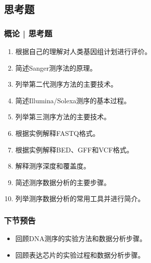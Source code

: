 \subsection{思考题}
\begin{frame}
  \frametitle{概论 | 思考题}
  \begin{enumerate}
    \item 根据自己的理解对人类基因组计划进行评价。
    \item 简述Sanger测序法的原理。
    \item 列举第二代测序方法的主要技术。
    \item 简述Illumina/Solexa测序的基本过程。
    \item 列举第三测序方法的主要技术。
    \item 根据实例解释FASTQ格式。
    \item 根据实例解释BED、GFF和VCF格式。
    \item 解释测序深度和覆盖度。
    \item 简述测序数据分析的主要步骤。
    \item 列举测序数据分析的常用工具并进行简介。
  \end{enumerate}
\end{frame}

\begin{frame}
  \frametitle{下节预告}
  \begin{itemize}
    \item 回顾DNA测序的实验方法和数据分析步骤。
    \item 回顾表达芯片的实验过程和数据分析步骤。
  \end{itemize}
\end{frame}




